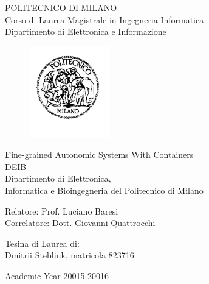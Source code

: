 \thispagestyle{empty}
\vspace*{-1.5cm} \bfseries{
\begin{center}
  \large
  POLITECNICO DI MILANO\\
  \normalsize
  Corso di Laurea Magistrale in Ingegneria Informatica\\
  Dipartimento di Elettronica e Informazione\\
  \begin{figure}[htbp]
    \begin{center}
      \includegraphics[width=3.5cm]{./pictures/logopm}
    \end{center}
  \end{figure}
  \vspace*{0.3cm} \LARGE



  \textbf Fine-grained Autonomic Systems With Containers\\



  \vspace*{.75truecm} \large
  DEIB \\
  Dipartimento di Elettronica,   \\
  Informatica e Bioingegneria del Politecnico di Milano
\end{center}
\vspace*{3.0cm} \large
\begin{flushleft}


  Relatore: Prof. Luciano Baresi \\
  Correlatore: Dott. Giovanni Quattrocchi 

\end{flushleft}
\vspace*{1.0cm}
\begin{flushright}


  Tesina di Laurea di:\\ Dmitrii Stebliuk, matricola 823716 \\ 


\end{flushright}
\vspace*{0.5cm}
\begin{center}



  Academic Year 20015-20016
\end{center} \clearpage
}
